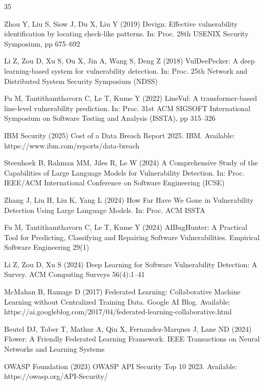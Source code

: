 \documentclass[pdflatex,sn-mathphys-num]{sn-jnl}
\theoremstyle{thmstyleone}%
\theoremstyle{thmstyletwo}%
\theoremstyle{thmstylethree}%
\begin{document}

\begin{thebibliography}{35}



Zhou Y, Liu S, Siow J, Du X, Liu Y (2019) Devign: Effective vulnerability identification by locating check-like patterns. In: Proc. 28th USENIX Security Symposium, pp 675--692

Li Z, Zou D, Xu S, Ou X, Jin A, Wang S, Deng Z (2018) VulDeePecker: A deep learning-based system for vulnerability detection. In: Proc. 25th Network and Distributed System Security Symposium (NDSS)

Fu M, Tantithamthavorn C, Le T, Kume Y (2022) LineVul: A transformer-based line-level vulnerability prediction. In: Proc. 31st ACM SIGSOFT International Symposium on Software Testing and Analysis (ISSTA), pp 315--326

IBM Security (2025) Cost of a Data Breach Report 2025. IBM. Available: https://www.ibm.com/reports/data-breach

Steenhoek B, Rahman MM, Jiles R, Le W (2024) A Comprehensive Study of the Capabilities of Large Language Models for Vulnerability Detection. In: Proc. IEEE/ACM International Conference on Software Engineering (ICSE)

Zhang J, Liu H, Liu K, Yang L (2024) How Far Have We Gone in Vulnerability Detection Using Large Language Models. In: Proc. ACM ISSTA

Fu M, Tantithamthavorn C, Le T, Kume Y (2024) AIBugHunter: A Practical Tool for Predicting, Classifying and Repairing Software Vulnerabilities. Empirical Software Engineering 29(1)

Li Z, Zou D, Xu S (2024) Deep Learning for Software Vulnerability Detection: A Survey. ACM Computing Surveys 56(4):1--41

McMahan B, Ramage D (2017) Federated Learning: Collaborative Machine Learning without Centralized Training Data. Google AI Blog. Available: https://ai.googleblog.com/2017/04/federated-learning-collaborative.html

Beutel DJ, Tober T, Mathur A, Qiu X, Fernandez-Marques J, Lane ND (2024) Flower: A Friendly Federated Learning Framework. IEEE Transactions on Neural Networks and Learning Systems

OWASP Foundation (2023) OWASP API Security Top 10 2023. Available: https://owasp.org/API-Security/


\end{thebibliography}
\end{document}

